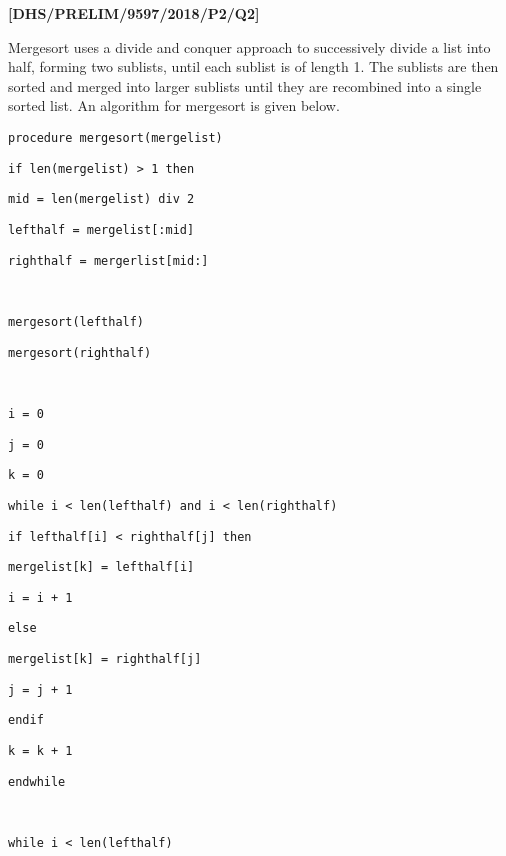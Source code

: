 \item \textbf{{[}DHS/PRELIM/9597/2018/P2/Q2{]} }

Mergesort uses a divide and conquer approach to successively divide
a list into half, forming two sublists, until each sublist is of length
1. The sublists are then sorted and merged into larger sublists until
they are recombined into a single sorted list. An algorithm for mergesort
is given below.

\noindent %
\noindent\begin{minipage}[t]{1\columnwidth}%
\texttt{procedure mergesort(mergelist)}

\texttt{\qquad{}if len(mergelist) > 1 then }

\texttt{\qquad{}\qquad{}mid = len(mergelist) div 2}

\texttt{\qquad{}\qquad{}lefthalf = mergelist{[}:mid{]}}

\texttt{\qquad{}\qquad{}righthalf = mergerlist{[}mid:{]}}

\texttt{\bigskip{}
}

\texttt{\qquad{}\qquad{}mergesort(lefthalf) }

\texttt{\qquad{}\qquad{}mergesort(righthalf)}

\texttt{\bigskip{}
}

\texttt{\qquad{}\qquad{}i = 0}

\texttt{\qquad{}\qquad{}j = 0}

\texttt{\qquad{}\qquad{}k = 0 }

\texttt{\qquad{}\qquad{}while i < len(lefthalf) and i < len(righthalf)}

\texttt{\qquad{}\qquad{}\qquad{}if lefthalf{[}i{]} < righthalf{[}j{]}
then}

\texttt{\qquad{}\qquad{}\qquad{}\qquad{}mergelist{[}k{]} = lefthalf{[}i{]}}

\texttt{\qquad{}\qquad{}\qquad{}\qquad{}i = i + 1 }

\texttt{\qquad{}\qquad{}\qquad{}else}

\texttt{\qquad{}\qquad{}\qquad{}\qquad{}mergelist{[}k{]} = righthalf{[}j{]} }

\texttt{\qquad{}\qquad{}\qquad{}\qquad{}j = j + 1}

\texttt{\qquad{}\qquad{}\qquad{}endif }

\texttt{\qquad{}\qquad{}\qquad{}k = k + 1 }

\texttt{\qquad{}\qquad{}endwhile }

\texttt{\bigskip{}
}

\texttt{\qquad{}\qquad{}while i < len(lefthalf) }


\end{minipage}
